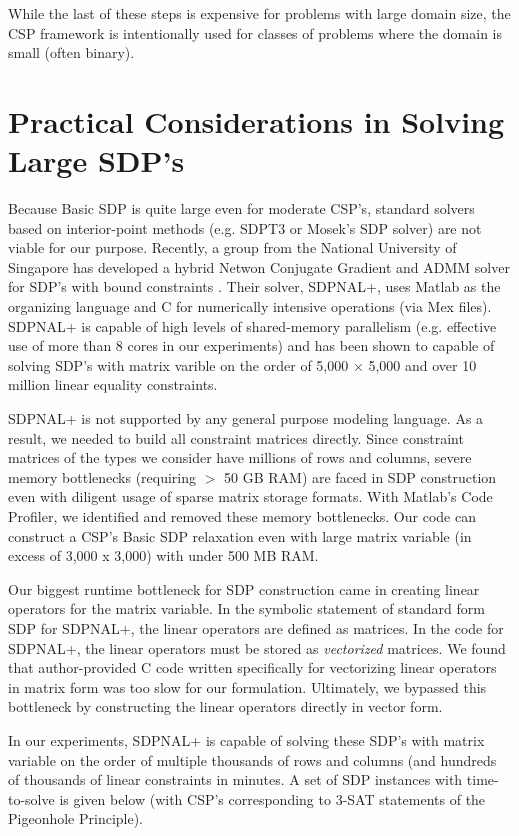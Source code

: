 \documentclass[12pt]{article} %
\begin{document}
While the last of these steps is expensive for problems with large domain size, the CSP framework is intentionally used for classes of problems where the domain is small (often binary).

\section{Practical Considerations in Solving Large SDP's}

Because Basic SDP is quite large even for moderate CSP's, standard solvers based on interior-point methods (e.g. SDPT3 or Mosek's SDP solver) are not viable for our purpose. Recently, a group from the National University of Singapore has developed a hybrid Netwon Conjugate Gradient and ADMM solver for SDP's with bound constraints \cite{yang2015sdpnal+, zhao2010newton}. Their solver, SDPNAL+, uses Matlab as the organizing language and C for numerically intensive operations (via Mex files). SDPNAL+ is capable of high levels of shared-memory parallelism (e.g. effective use of more than 8 cores in our experiments) and has been shown to capable of solving SDP's with matrix varible on the order of 5,000 $\times$ 5,000 and over 10 million linear equality constraints.

SDPNAL+ is not supported by any general purpose modeling language. As a result, we needed to build all constraint matrices directly. Since constraint matrices of the types we consider have millions of rows and columns, severe memory bottlenecks (requiring $>$ 50 GB RAM) are faced in SDP construction even with diligent usage of sparse matrix storage formats. With Matlab's Code Profiler, we identified and removed these memory bottlenecks. Our code can construct a CSP's Basic SDP relaxation even with large matrix variable (in excess of 3,000 x 3,000) with under 500 MB RAM. 

Our biggest runtime bottleneck for SDP construction came in creating linear operators for the matrix variable. In the symbolic statement of standard form SDP for SDPNAL+, the linear operators are defined as matrices. In the code for SDPNAL+, the linear operators must be stored as \textit{vectorized} matrices. We found that author-provided C code written specifically for vectorizing linear operators in matrix form was too slow for our formulation. Ultimately, we bypassed this bottleneck by constructing the linear operators directly in vector form.

In our experiments, SDPNAL+ is capable of solving these SDP's with matrix variable on the order of multiple thousands of rows and columns (and hundreds of thousands of linear constraints in minutes. A set of SDP instances with time-to-solve is given below (with CSP's corresponding to 3-SAT statements of the Pigeonhole Principle).
\end{document}
